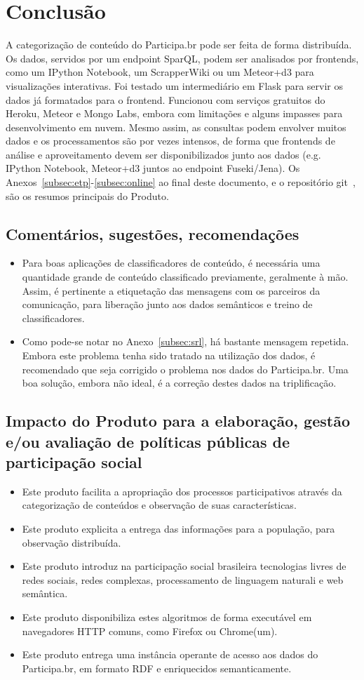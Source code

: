 \documentclass[12pt]{article}
\begin{document}
\section{Conclusão}
A categorização de conteúdo do Participa.br pode ser feita de forma distribuída. Os dados, servidos por um endpoint SparQL, podem ser analisados por frontends, como um IPython Notebook, um ScrapperWiki ou um Meteor+d3 para visualizações interativas. Foi testado um intermediário em Flask para servir os dados já formatados para o frontend. Funcionou com serviços gratuitos do Heroku, Meteor e Mongo Labs, embora com limitações e alguns impasses para desenvolvimento em nuvem. Mesmo assim, as consultas podem envolver muitos dados e os processamentos são por vezes intensos, de forma que frontends de análise e aproveitamento devem ser disponibilizados junto aos dados (e.g. IPython Notebook, Meteor+d3 juntos ao endpoint Fuseki/Jena). Os Anexos~\ref{subsec:etp}-\ref{subsec:online} ao final deste documento, e o repositório git~\cite{repoProd3}, são os resumos principais do Produto.
\subsection{Comentários, sugestões, recomendações}
\begin{itemize}
    \item Para boas aplicações de classificadores de conteúdo, é necessária uma quantidade grande de conteúdo classificado previamente, geralmente à mão. Assim, é pertinente a etiquetação das mensagens com os parceiros da comunicação, para liberação junto aos dados semânticos e treino de classificadores.
    \item Como pode-se notar no Anexo~\ref{subsec:srl}, há bastante mensagem repetida. Embora este problema tenha sido tratado na utilização dos dados, é recomendado que seja corrigido o problema nos dados do Participa.br. Uma boa solução, embora não ideal, é a correção destes dados na triplificação.
\end{itemize}
\subsection{Impacto do Produto para a elaboração, gestão e/ou avaliação de políticas públicas de participação social}
\begin{itemize}
    \item Este produto facilita a apropriação dos processos participativos através da categorização de conteúdos e observação de suas características. 
    \item Este produto explicita a entrega das informações para a população, para observação distribuída.
    \item Este produto introduz na participação social brasileira tecnologias livres de redes sociais, redes complexas, processamento de linguagem naturali e web semântica.
    \item Este produto disponibiliza estes algoritmos de forma executável em navegadores HTTP comuns, como Firefox ou Chrome(um).
    \item Este produto entrega uma instância operante de acesso aos dados do Participa.br, em formato RDF e enriquecidos semanticamente.
\end{itemize}
\end{document}

